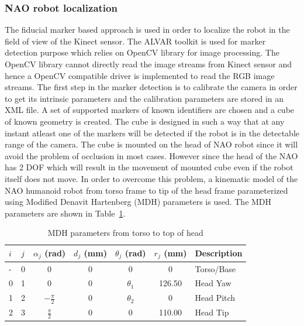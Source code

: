 \subsubsection{NAO robot localization}
The fiducial marker based approach is used in order to localize the robot in the field of view of the Kinect sensor. The ALVAR \cite{ALVAR} toolkit is used for marker detection purpose which relies on OpenCV library for image processing. The OpenCV library cannot directly read the image streams from Kinect sensor and hence a OpenCV compatible driver is implemented to read the RGB image streams. The first step in the marker detection is to calibrate the camera in order to get its intrinsic parameters and the calibration parameters are stored in an XML file. A set of supported markers of known identifiers are chosen and a cube of known geometry is created. The cube is designed in such a way that at any instant atleast one of the markers will be detected if the robot is in the detectable range of the camera. The cube is mounted on the head of NAO robot since it will avoid the problem of occlusion in most cases. However since the head of the NAO has 2 DOF which will result in the movement of mounted cube even if the robot itself does not move. In order to overcome this problem, a kinematic model of the NAO humanoid robot from torso frame to tip of the head frame parameterized using Modified Denavit Hartenberg (MDH) \cite{khalil2004modeling} parameters is used. The MDH parameters are shown in Table~\ref{table:nao_mdh}.
\begin{table}[H]
\centering
\caption{MDH parameters from torso to top of head}
\label{table:nao_mdh}
\begin{tabular}{|l|l|c|c|c|c|p{2cm}|}
\hline
  \textbf{$i$}  & \textbf{$j$}  & \textbf{$\alpha_j$ (rad)} & \textbf{$d_j$ (mm)} & \textbf{$\theta_j$ (rad)} & \textbf{$r_j$ (mm)} & \textbf{Description}
  \tabularnewline \hline
  - & 0 & 0 & 0 & 0 & 0 & Torso/Base
                                          \tabularnewline\hline
                                          
  0 & 1 & 0 & 0 & $\theta_1$ & 126.50 & Head Yaw
                                          \tabularnewline\hline
                       
  1 & 2 & $-\frac{\pi}{2}$ & 0 & $\theta_2$ & 0 & Head Pitch
                                          \tabularnewline\hline                    
  
  2 & 3 & $\frac{\pi}{2}$ & 0 & 0 & 110.00 & Head Tip
                                          \tabularnewline\hline
\end{tabular}
\end{table}

